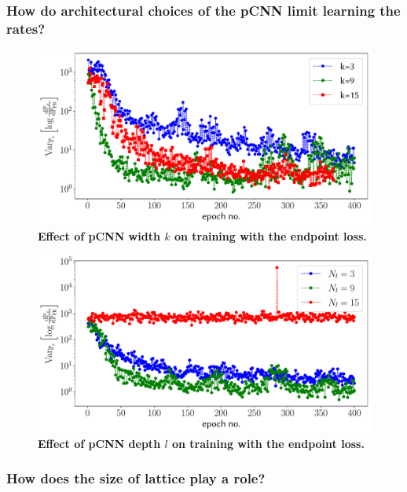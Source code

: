 \subsubsection{How do architectural choices of the pCNN limit learning the rates?}
\begin{figure}[H]
	\centering
	\includegraphics[width=\linewidth]{Chapter6/Figs/Vector/wvl_single}
	\caption[Effect of pCNN width $k$ on training with the endpoint loss.]{\textbf{Effect of pCNN width $k$ on training with the endpoint loss.}}
	\label{fig:wvlsingle}
\end{figure}
\begin{figure}[H]
	\centering
	\includegraphics[width=\linewidth]{Chapter6/Figs/Vector/lvl_single}
	\caption[Effect of pCNN depth $l$ on training with the endpoint loss.]{\textbf{Effect of pCNN depth $l$ on training with the endpoint loss.}}
	\label{fig:lvlsingle}
\end{figure}


\subsubsection{How does the size of lattice play a role?}

